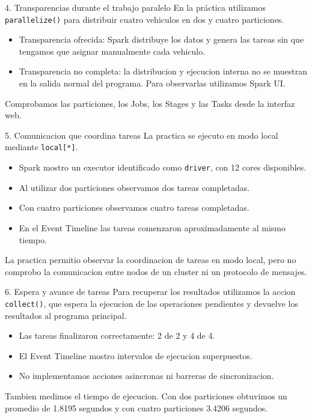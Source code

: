 \begin{frame}{4. Transparencias durante el trabajo paralelo}
  En la práctica utilizamos \texttt{parallelize()} para distribuir cuatro vehiculos en dos y cuatro particiones.

  \begin{itemize}
    \item Transparencia ofrecida: Spark distribuye los datos y genera las tareas sin que tengamos que asignar manualmente cada vehiculo.
    \item Transparencia no completa: la distribucion y ejecucion interna no se muestran en la salida normal del programa. Para observarlas utilizamos Spark UI.
  \end{itemize}

  Comprobamos las particiones, los Jobs, los Stages y las Tasks desde la interfaz web.

  \par
\end{frame}

\begin{frame}{5. Comunicacion que coordina tareas}
  La practica se ejecuto en modo local mediante \texttt{local[*]}.

  \begin{itemize}
    \item Spark mostro un executor identificado como \texttt{driver}, con 12 cores disponibles.
    \item Al utilizar dos particiones observamos dos tareas completadas.
    \item Con cuatro particiones observamos cuatro tareas completadas.
    \item En el Event Timeline las tareas comenzaron aproximadamente al mismo tiempo.
  \end{itemize}

  La practica permitio observar la coordinacion de tareas en modo local, pero no comprobo la comunicacion entre nodos de un cluster ni un protocolo de mensajes.

  \par
\end{frame}

\begin{frame}{6. Espera y avance de tareas}
  Para recuperar los resultados utilizamos la accion \texttt{collect()}, que espera la ejecucion de las operaciones pendientes y devuelve los resultados al programa principal.

  \begin{itemize}
    \item Las tareas finalizaron correctamente: 2 de 2 y 4 de 4.
    \item El Event Timeline mostro intervalos de ejecucion superpuestos.
    \item No implementamos acciones asincronas ni barreras de sincronizacion.
  \end{itemize}

  Tambien medimos el tiempo de ejecucion. Con dos particiones obtuvimos un promedio de 1.8195 segundos y con cuatro particiones 3.4206 segundos.

  \par
\end{frame}
